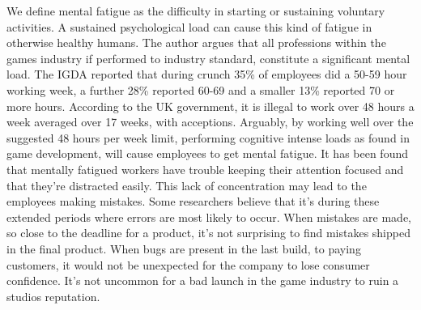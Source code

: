 \documentclass{scrartcl}
\begin{document}
We define mental fatigue as the difficulty in starting or sustaining voluntary activities\cite{chaudhuri2004fatigue}. A sustained psychological load can cause this kind of fatigue in otherwise healthy humans\cite {mizuno2011mental}. The author argues that all professions within the games industry if performed to industry standard, constitute a significant mental load. The IGDA reported that during crunch 35\% of employees did a 50-59 hour working week, a further 28\% reported 60-69 and a smaller 13\% reported 70 or more hours\cite[p.20]{weststarlegault2016}. According to the UK government, it is illegal to work over 48 hours a week averaged over 17 weeks, with acceptions\cite{maximumweeklyhours}. Arguably, by working well over the suggested 48 hours per week limit, performing cognitive intense loads as found in game development, will cause employees to get mental fatigue. It has been found that mentally fatigued workers have trouble keeping their attention focused and that they're distracted easily\cite{bartlett1943ferrier}. This lack of concentration may lead to the employees making mistakes. Some researchers believe that it's during these extended periods where errors are most likely to occur\cite{olson2011overtime}. When mistakes are made, so close to the deadline for a product, it's not surprising to find mistakes shipped in the final product. When bugs are present in the last build, to paying customers, it would not be unexpected for the company to lose consumer confidence.  It's not uncommon for a bad launch in the game industry to ruin a studios reputation. 


\end{document}
